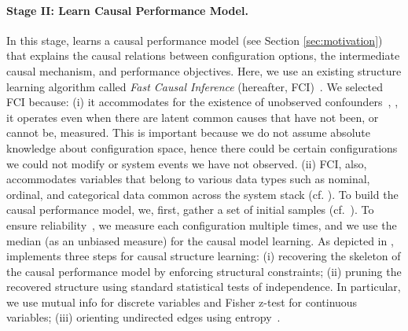 \paragraph{Stage II: Learn Causal Performance Model.}
\label{sect:structure_discovery}
In this stage, \ourapproach learns a causal performance model (see Section \ref{sec:motivation}) that explains the causal relations between configuration options, the intermediate causal mechanism, and performance objectives. Here, we use an existing structure learning algorithm  called \textit{Fast Causal Inference} (hereafter, FCI)~\cite{spirtes2000causation}. We selected FCI because: (i) it accommodates for the existence of unobserved confounders~\cite{spirtes2000causation,ogarrio2016hybrid, glymour2019review}, \ie, it operates even when there are latent common causes that have not been, or cannot be, measured. This is important because we do not assume absolute knowledge about configuration space, hence there could be certain configurations we could not modify or system events we have not observed. (ii) FCI, also, accommodates variables that belong to various data types such as nominal, ordinal, and categorical data common across the system stack (cf. ).
To build the causal performance model, we, first, gather a set of initial samples (cf.~). To ensure reliability~\cite{curtsinger2013stabilizer,ding2021generalizable}, we measure each configuration multiple times, and we use the median (as an unbiased measure) for the causal model learning. As depicted in , \ourapproach implements three steps for causal structure learning: (i) recovering the skeleton of the causal performance model by enforcing structural constraints; (ii) pruning the recovered structure using standard statistical tests of independence. In particular, we use mutual info for discrete variables and Fisher z-test for continuous variables; (iii) orienting undirected edges using entropy~\cite{spirtes2000causation,ogarrio2016hybrid, glymour2019review,colombo2012learning,colombo2014order}.



